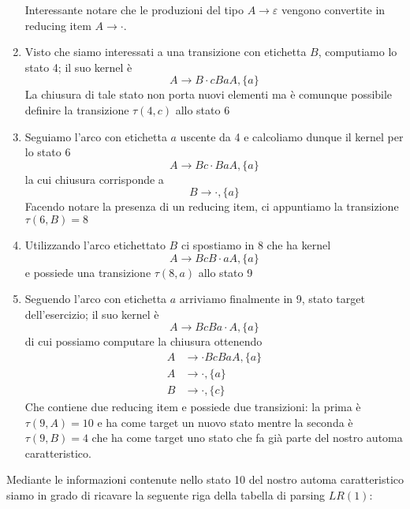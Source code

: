 \documentclass[class=book, crop=false, oneside, 12pt]{standalone}
\begin{document}
\begin{enumerate}
    Interessante notare che le produzioni del tipo \(A \to \varepsilon\) vengono convertite in reducing item \(A \to \cdot\).
    \item Visto che siamo interessati a una transizione con etichetta \(B\), computiamo lo stato 4; il suo kernel è 
    \begin{equation*}
        A \to B \cdot cBaA, \{a\} 
    \end{equation*}
    La chiusura di tale stato non porta nuovi elementi ma è comunque possibile definire la transizione \(\tau(4,c)\) allo stato 6
    \item Seguiamo l'arco con etichetta \(a\) uscente da 4 e calcoliamo dunque il kernel per lo stato 6
    \begin{equation*}
        A \to Bc \cdot BaA, \{a\} 
    \end{equation*}
    la cui chiusura corrisponde a 
    \begin{equation*}
         B \to \cdot, \{a\} 
    \end{equation*}
    Facendo notare la presenza di un reducing item, ci appuntiamo la transizione \(\tau(6, B)=8\)
    \item Utilizzando l'arco etichettato \(B\) ci spostiamo in 8 che ha kernel
    \begin{equation*}
        A \to BcB \cdot aA, \{a\} 
    \end{equation*}
    e possiede una transizione \(\tau(8, a)\) allo stato 9
    \item Seguendo l'arco con etichetta \(a\) arriviamo finalmente in 9, stato target dell'esercizio; il suo kernel è
    \begin{equation*}
        A \to BcBa \cdot A, \{a\} 
    \end{equation*}
    di cui possiamo computare la chiusura ottenendo
    \begin{align*}
        A &\to \cdot BcBaA, \{a\} \\
        A &\to \cdot, \{a\} \\
        B &\to \cdot, \{c\}
    \end{align*}
    Che contiene due reducing item e possiede due transizioni: la prima è \(\tau(9, A)=10\) e ha come target un nuovo stato mentre la seconda è \(\tau(9, B)=4\) che ha come target uno stato che fa già parte del nostro automa caratteristico.
\end{enumerate}

Mediante le informazioni contenute nello stato 10 del nostro automa caratteristico siamo in grado di ricavare la seguente riga della tabella di parsing \(LR(1)\):
\end{document}

